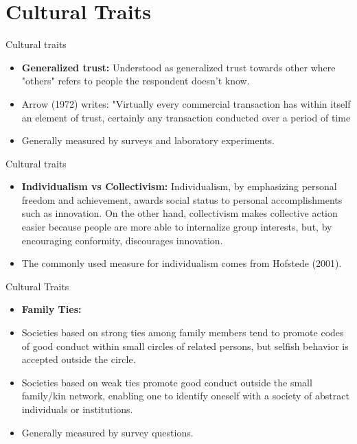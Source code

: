 \documentclass{beamer}
\begin{document}
\section{Cultural Traits}
\begin{frame}{Cultural traits}
\begin{itemize}
    \item  \textbf{Generalized trust:} Understood as generalized trust towards other where "others" refers to people the respondent doesn't know.
            \vspace{0.3cm}
        \pause 
    \item Arrow (1972)  writes: "Virtually every commercial transaction has within itself an element of trust, certainly any transaction conducted over a period of time
               \vspace{0.3cm}
        \pause 
    \item Generally measured by surveys and laboratory experiments.
\end{itemize}
    \end{frame}
    \begin{frame}{Cultural traits}
    \begin{itemize}
    \item  \textbf{Individualism vs Collectivism:} Individualism, by emphasizing
 personal freedom and achievement, awards social status to personal accomplishments such as innovation. On the other hand, collectivism  makes collective action easier because people are more able to internalize group interests, but, by encouraging conformity, discourages innovation.
             \vspace{0.3cm}
        \pause 
        \item The commonly used measure for individualism comes from Hofstede (2001).
    \end{itemize}
        
    \end{frame}
       \begin{frame}{Cultural Traits}
    \begin{itemize}
    \item  \textbf{Family Ties:}
            \vspace{0.3cm}
        \pause 
        \item  Societies  based on strong ties among family members tend to promote codes of good conduct within small circles of related persons, but selfish behavior is accepted outside the circle.
            \vspace{0.3cm}
        \pause 
        \item Societies based on weak ties promote good conduct outside the small family/kin network, enabling one  to identify oneself with a society of abstract individuals or institutions.
             \vspace{0.3cm}
        \pause 
        \item Generally measured by survey questions.
    \end{itemize}
        
    \end{frame}
\end{document}
